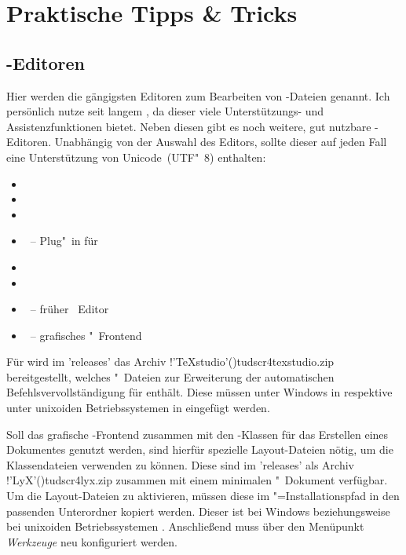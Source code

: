 \chapter{%
  Praktische Tipps \& Tricks%
  \label{sec:tips}%
}
\section{%
  -Editoren%
  \label{sec:tips:editor}%
}

Hier werden die gängigsten Editoren zum Bearbeiten von -Dateien 
genannt. Ich persönlich nutze seit langem , da 
dieser viele Unterstützungs- und Assistenzfunktionen bietet. Neben diesen gibt 
es noch weitere, gut nutzbare -Editoren. Unabhängig von der 
Auswahl des Editors, sollte dieser auf jeden Fall eine Unterstützung von 
Unicode~(UTF"~8) enthalten:
%
\begin{itemize}
\item {}
\item {}
\item {}
\item {}~-- Plug"~in für 
\item {}
\item {}
\item {}~-- früher ~Editor
\item {}~-- grafisches "~Frontend
\end{itemize}

Für  wird im \GitHubRepo'releases' das 
Archiv \GitHubFile!'TeXstudio'(){tudscr4texstudio.zip} 
bereitgestellt, welches "~Dateien zur Erweiterung der automatischen 
Befehlsvervollständigung für \TUDScript enthält. Diese müssen unter Windows in 
 respektive unter unixoiden Betriebssystemen in 
 eingefügt werden.

Soll das grafische -Frontend  
zusammen mit den \TUDScript-Klassen für das Erstellen eines Dokumentes genutzt 
werden, sind hierfür spezielle Layout-Dateien nötig, um die Klassendateien 
verwenden zu können. Diese sind im \GitHubRepo'releases' als Archiv 
\GitHubFile!'LyX'(){tudscr4lyx.zip} zusammen mit einem minimalen 
"~Dokument verfügbar. Um die Layout-Dateien zu 
aktivieren, müssen diese im "=Installationspfad in 
den passenden Unterordner kopiert werden. Dieser ist bei Windows 
beziehungsweise bei unixoiden Betriebssystemen .
Anschließend muss  über den Menüpunkt 
\emph{Werkzeuge} neu konfiguriert werden.



